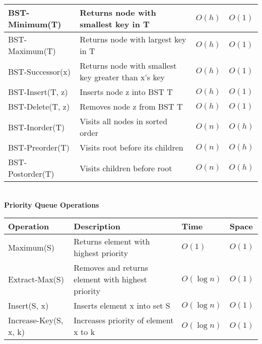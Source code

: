 {{\begin{minipage}[t]{0.49\textwidth}
\begin{tabular}{|p{}|p{}|p{}|p{}|}
\hline
BST-Minimum(T) & Returns node with smallest key in T & $O(h)$ & $O(1)$ \\
\hline
BST-Maximum(T) & Returns node with largest key in T & $O(h)$ & $O(1)$ \\
\hline
BST-Successor(x) & Returns node with smallest key greater than x's key & $O(h)$ & $O(1)$ \\
\hline
BST-Insert(T, z) & Inserts node z into BST T & $O(h)$ & $O(1)$ \\
\hline
BST-Delete(T, z) & Removes node z from BST T & $O(h)$ & $O(1)$ \\
\hline
BST-Inorder(T) & Visits all nodes in sorted order & $O(n)$ & $O(h)$ \\
\hline
BST-Preorder(T) & Visits root before its children & $O(n)$ & $O(h)$ \\
\hline
BST-Postorder(T) & Visits children before root & $O(n)$ & $O(h)$ \\
\hline
\end{tabular}\\

\textbf{Priority Queue Operations}\\
\begin{tabular}{|p{}|p{}|p{}|p{}|}
\hline
\textbf{Operation} & \textbf{Description} & \textbf{Time} & \textbf{Space} \\
\hline
Maximum(S) & Returns element with highest priority & $O(1)$ & $O(1)$ \\
\hline
Extract-Max(S) & Removes and returns element with highest priority & $O(\log n)$ & $O(1)$ \\
\hline
Insert(S, x) & Inserts element x into set S & $O(\log n)$ & $O(1)$ \\
\hline
Increase-Key(S, x, k) & Increases priority of element x to k & $O(\log n)$ & $O(1)$ \\
\hline
\end{tabular}\\
\end{minipage}
}} 